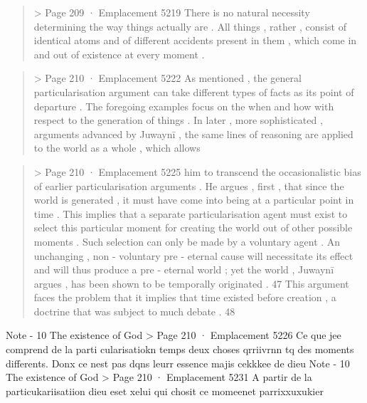 \begin{quote} > Page 209 · Emplacement 5219
There is no natural necessity determining the way things actually are . All things , rather , consist of identical atoms and of different accidents present in them , which come in and out of existence at every moment .
\end{quote} \begin{quote}> Page 210 · Emplacement 5222
As mentioned , the general particularisation argument can take different types of facts as its point of departure . The foregoing examples focus on the when and how with respect to the generation of things . In later , more sophisticated , arguments advanced by Juwaynī , the same lines of reasoning are applied to the world as a whole , which allows
\end{quote} \begin{quote}> Page 210 · Emplacement 5225
him to transcend the occasionalistic bias of earlier particularisation arguments . He argues , first , that since the world is generated , it must have come into being at a particular point in time . This implies that a separate particularisation agent must exist to select this particular moment for creating the world out of other possible moments . Such selection can only be made by a voluntary agent . An unchanging , non - voluntary pre - eternal cause will necessitate its effect and will thus produce a pre - eternal world ; yet the world , Juwaynī argues , has been shown to be temporally originated . 47 This argument faces the problem that it implies that time existed before creation , a doctrine that was subject to much debate . 48
\end{quote}
Note - 10 The existence of God > Page 210 · Emplacement 5226
Ce que jee comprend de la parti cularisatiokn temps deux choses qrriivrnn tq des moments differents. Donx ce nest pas dqns leurr essence majis cekkkee de dieu
Note - 10 The existence of God > Page 210 · Emplacement 5231
A partir de la particukariisatiion dieu eset xelui qui chosit ce momeenet parrixxuxukier




